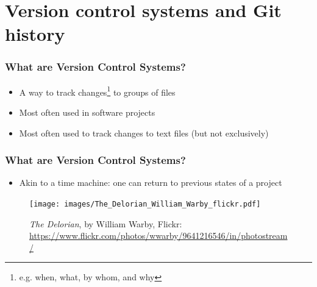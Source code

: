 \section{Version control systems and Git history}

\begin{frame}
\frametitle{What are Version Control Systems?}
\begin{itemize}

    \item A way to track changes\footnote[frame]{e.g. when, what, by whom,
        and why} to groups of files
    \item Most often used in software projects
    \item Most often used to track changes to text files (but not
        exclusively)
\end{itemize}
\end{frame}

\begin{frame}[fragile]
\frametitle{What are Version Control Systems?}
\begin{itemize}
    \item Akin to a time machine: one can return to previous states of a
        project
\end{itemize}
\begin{figure}
    \centerline{%
    \texttt{[image: images/The\_Delorian\_William\_Warby\_flickr.pdf]}}
        \caption{\tiny \emph{The Delorian}, by William Warby, Flickr:
    \url{https://www.flickr.com/photos/wwarby/9641216546/in/photostream/}}
\end{figure}
\end{frame}

